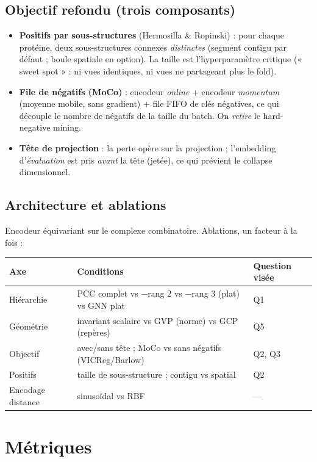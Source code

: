 \documentclass[11pt,a4paper]{article}
\begin{document}
\subsection{Objectif refondu (trois composants)}
\begin{itemize}[leftmargin=1.4em,itemsep=3pt]
  \item \textbf{Positifs par sous-structures} (Hermosilla \& Ropinski) : pour chaque
        protéine, deux sous-structures connexes \emph{distinctes} (segment contigu par
        défaut ; boule spatiale en option). La taille est l'hyperparamètre critique
        (« sweet spot » : ni vues identiques, ni vues ne partageant plus le fold).
  \item \textbf{File de négatifs (MoCo)} : encodeur \emph{online} + encodeur
        \emph{momentum} (moyenne mobile, sans gradient) + file FIFO de clés négatives,
        ce qui découple le nombre de négatifs de la taille du batch. On \emph{retire}
        le hard-negative mining.
  \item \textbf{Tête de projection} : la perte opère sur la projection ; l'embedding
        d'\emph{évaluation} est pris \emph{avant} la tête (jetée), ce qui prévient le
        collapse dimensionnel.
\end{itemize}

\subsection{Architecture et ablations}
Encodeur équivariant sur le complexe combinatoire. Ablations, un facteur à la fois :
\begin{center}\small
\begin{tabular}{@{}p{3.2cm} p{5.0cm} p{6.0cm}@{}}
\toprule
Axe & Conditions & Question visée \\
\midrule
Hiérarchie & PCC complet vs $-$rang 2 vs $-$rang 3 (plat) vs GNN plat & Q1 \\
Géométrie & invariant scalaire vs GVP (norme) vs GCP (repères) & Q5 \\
Objectif & avec/sans tête ; MoCo vs sans négatifs (VICReg/Barlow) & Q2, Q3 \\
Positifs & taille de sous-structure ; contigu vs spatial & Q2 \\
Encodage distance & sinuso\"idal vs RBF & --- \\
\bottomrule
\end{tabular}
\end{center}

\section{Métriques}
\end{document}
